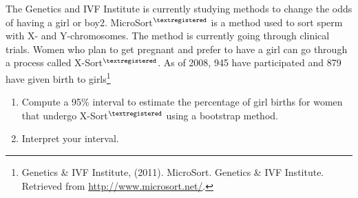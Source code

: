 \begin{enumerate}
       The Genetics and IVF Institute is currently studying methods to
       change the odds of having a girl or
       boy2. MicroSort$^{\textregistered}$ is a method used to sort sperm
       with X- and Y-chromosomes. The method is currently going
       through clinical trials. Women who plan to get pregnant and
       prefer to have a girl can go through a process called
       X-Sort$^{\textregistered}$. As of 2008, 945 have participated and
       879 have given birth to girls\footnote{Genetics \& IVF
         Institute, (2011). MicroSort. Genetics \& IVF
         Institute. Retrieved from \url{http://www.microsort.net/}. }
       \begin{enumerate}
       \item  Compute a 95\% interval to estimate the percentage of
         girl births for women that undergo X-Sort$^{\textregistered}$
         using a bootstrap method. 
\begin{students}
          \vspace{2cm}
\end{students}
\begin{key}
 {\it  }      
\end{key} 

       \item  Interpret your interval. 
\begin{students}
          \vspace{4cm}
\end{students}
\begin{key}
 {\it  }      
\end{key}


\end{enumerate}
\end{enumerate}
